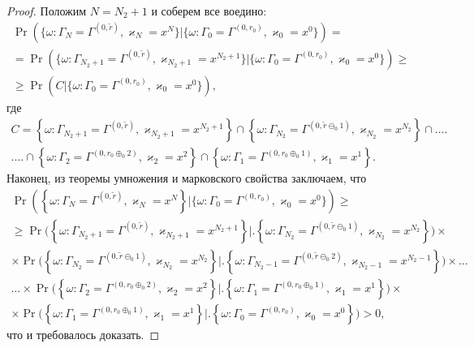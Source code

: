 \documentclass[a4paper,12pt,russian]{extarticle}
\begin{document}
\begin{proof}
Положим $N = N_2+1$ и соберем все воедино:
\begin{multline*}
\Pr(\{\omega\colon\Gamma_{N}=\Gamma^{(0,\tilde{r} )}, \varkappa_{N}=x^N\}| \{\omega\colon
\Gamma_{0}=\Gamma^{(0,r_0)}, \varkappa_{0}=x^0\}) = \\ =
\Pr(\{\omega\colon\Gamma_{ N_2+1}=\Gamma^{(0,\tilde{r} )}, \varkappa_{ N_2+1}=x^{N_2+1}\}|\{\omega\colon
\Gamma_{0}=\Gamma^{(0,r_0)}, \varkappa_{0}=x^0\}) \geqslant \\ 
\geqslant
\Pr(C|\{\omega\colon\Gamma_{0}=\Gamma^{(0,r_0)}, \varkappa_{0}=x^0\}),
\end{multline*}
где 
\begin{multline*}
    C = \left\{\omega\colon\Gamma_{ N_2+1}=\Gamma^{(0,\tilde{r} )}, \varkappa_{ N_2+1}=x^{N_2+1}\right\} \cap \left\{ \omega\colon \Gamma_{ N_2}=\Gamma^{(0,\tilde{r} \ominus_0 1 )}, \varkappa_{N_2}=x^{N_2}\right\} \cap\ldots \biggr.\\ \biggl.
\ldots \cap \left\{\omega\colon\Gamma_{2}=\Gamma^{(0,r_0\oplus_{0}2)},\varkappa_{2}=x^2\right\} \cap \left\{\omega\colon \Gamma_{1}=\Gamma^{(0,r_0\oplus_{0}1)},\varkappa_{1}=x^1\right\}.
\end{multline*}
Наконец, из теоремы умножения и марковского свойства заключаем, что 
\begin{multline*}
\Pr(\left\{\omega\colon \Gamma_{N}=\Gamma^{(0,\tilde{r} )}, \varkappa_{N}=x^N\right\} |\{\omega\colon 
\Gamma_{0}=\Gamma^{(0,r_0)}, \varkappa_{0}=x^0\}) \geqslant \\ 
\geqslant
\Pr\biggl(\left\{\omega\colon \Gamma_{ N_2+1}=\Gamma^{(0,\tilde{r} )}, \varkappa_{ N_2+1}=x^{N_2+1}\right\} \biggr|\biggl. \left\{\omega\colon \Gamma_{ N_2}=\Gamma^{(0,\tilde{r} \ominus_0 1 )}, \varkappa_{N_2}=x^{N_2}\right\}\biggr) \times 
\\ \times
\Pr\biggl(\left\{\omega\colon\Gamma_{ N_2}=\Gamma^{(0,\tilde{r} \ominus_0 1 )}, \varkappa_{ N_2}=x^{N_2}\right\} \biggr|\biggl. \left\{\omega\colon \Gamma_{ N_2-1}=\Gamma^{(0,\tilde{r} \ominus_0 2 )}, \varkappa_{N_2-1}=x^{N_2-1}\right\}\biggr) \times \ldots \\
\ldots\times 
\Pr\biggl(\left\{\omega\colon\Gamma_{2}=\Gamma^{(0,r_0\oplus_{0}2)},\varkappa_{2}=x^2\right\} \biggr|\biggl. \left\{\omega\colon \Gamma_{1}=\Gamma^{(0,r_0\oplus_{0}1)},\varkappa_{1}=x^1\right\}\biggr) \times \\
\times
\Pr\biggl(\left\{\omega\colon\Gamma_{1}=\Gamma^{(0,r_0\oplus_{0}1)},\varkappa_{1}=x^1\right\} \biggr|\biggl. \left\{\omega\colon \Gamma_{0}=\Gamma^{(0,r_0)},\varkappa_{0}=x^0\right\}\biggr)>0,
\end{multline*}
что и требовалось доказать.
\end{proof}
\end{document}

